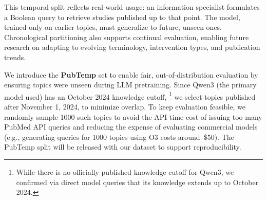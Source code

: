 This temporal split reflects real-world usage: an information specialist formulates a Boolean query to retrieve studies published up to that point. The model, trained only on earlier topics, must generalize to future, unseen ones. Chronological partitioning also supports continual evaluation, enabling future research on adapting to evolving terminology, intervention types, and publication trends.

We introduce the \textbf{PubTemp} set to enable fair, out-of-distribution evaluation by ensuring topics were unseen during LLM pretraining. Since Qwen3 (the primary model used) has an October 2024 knowledge cutoff,%
\footnote{While there is no officially published knowledge cutoff for Qwen3, we confirmed via direct model queries that its knowledge extends up to October 2024.} 
we select topics published after November 1, 2024, to minimize overlap. To keep evaluation feasible, we randomly sample \num{1000} such topics to avoid the API time cost of issuing too many PubMed API queries and reducing the expense of evaluating commercial models (e.g., generating queries for \num{1000} topics using O3 costs around~\$50). The PubTemp split will be released with our dataset to support reproducibility.